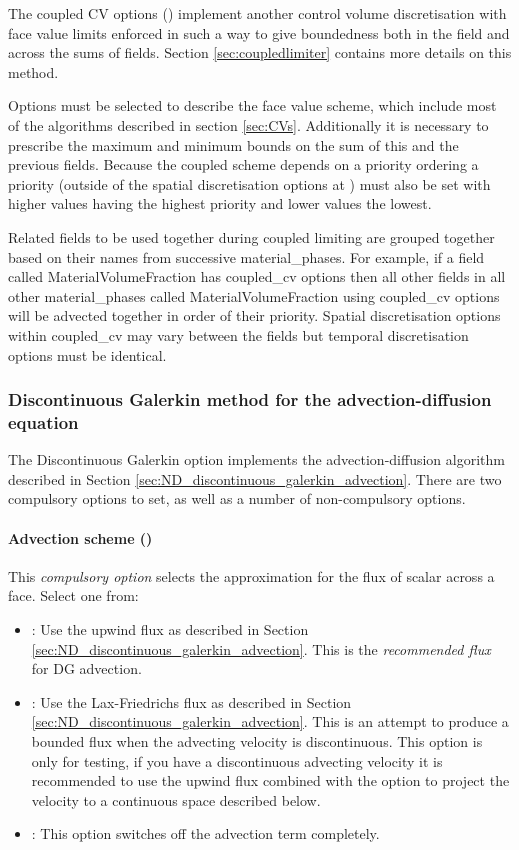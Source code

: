The coupled CV options () implement another control volume discretisation with face value limits enforced in such a way to give boundedness both in the field and across the sums of fields.  Section \ref{sec:coupledlimiter} contains more details on this method.

Options must be selected to describe the face value scheme, which include most of the algorithms described in section \ref{sec:CVs}.  Additionally it is necessary to prescribe the maximum and minimum bounds on the sum of this and the previous fields.  Because the coupled scheme depends on a priority ordering a priority (outside of the spatial discretisation options at ) must also be set with higher values having the highest priority and lower values the lowest.

Related fields to be used together during coupled limiting are grouped together based on their names from successive material\_phases.  For example, if a field called MaterialVolumeFraction has coupled\_cv options then all other fields in all other material\_phases called MaterialVolumeFraction using coupled\_cv options will be advected together in order of their priority.  Spatial discretisation options within coupled\_cv may vary between the fields but temporal discretisation options must be identical.

\subsubsection{Discontinuous Galerkin method for the
  advection-diffusion equation}

The Discontinuous Galerkin option implements the advection-diffusion
algorithm described in Section
\ref{sec:ND_discontinuous_galerkin_advection}. There are two
compulsory options to set, as well as a number of non-compulsory options.

\paragraph{Advection scheme ()} This
\emph{compulsory option} selects the approximation for the flux of
scalar across a face. Select one from:
\begin{itemize}
\item {}: Use the upwind flux as described in Section
  \ref{sec:ND_discontinuous_galerkin_advection}. This is the
  \emph{recommended flux} for DG advection.
\item {}: Use the Lax-Friedrichs flux as described in
  Section \ref{sec:ND_discontinuous_galerkin_advection}. This is an
  attempt to produce a bounded flux when the advecting velocity is
  discontinuous. This option is only for testing, if you have a
  discontinuous advecting velocity it is recommended to use the upwind
  flux combined with the option to project the velocity to a
  continuous space described below.
\item {}: This option switches off the advection term completely.
\end{itemize}

